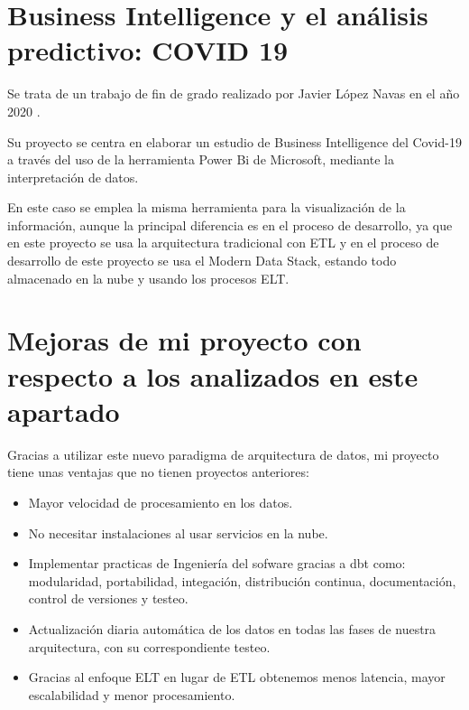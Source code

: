 \section{Business Intelligence y el análisis predictivo: COVID 19}
Se trata de un trabajo de fin de grado realizado por Javier López Navas en el año 2020 \cite{TFG3}.

Su proyecto se centra en elaborar un estudio de Business Intelligence del Covid-19 a través del uso de la herramienta Power Bi de Microsoft, mediante la interpretación de datos. 

En este caso se emplea la misma herramienta para la visualización de la información, aunque la principal diferencia es en el proceso de desarrollo, ya que en este proyecto se usa la arquitectura tradicional con ETL y en el proceso de desarrollo de este proyecto se usa el Modern Data Stack, estando todo almacenado en la nube y usando los procesos ELT.

\section{Mejoras de mi proyecto con respecto a los analizados en este apartado}
Gracias a utilizar este nuevo paradigma de arquitectura de datos, mi proyecto tiene unas ventajas que no tienen proyectos anteriores:
\begin{itemize}
    \item Mayor velocidad de procesamiento en los datos.
    \item No necesitar instalaciones al usar servicios en la nube.
    \item Implementar practicas de Ingeniería del sofware gracias a dbt como: modularidad, portabilidad, integación, distribución continua, documentación, control de versiones y testeo.
    \item Actualización diaria automática de los datos en todas las fases de nuestra arquitectura, con su correspondiente testeo.
    \item Gracias al enfoque ELT en lugar de ETL obtenemos menos latencia, mayor escalabilidad y menor procesamiento.
\end{itemize}